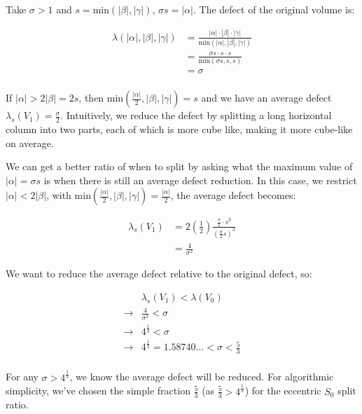 Take $\sigma > 1$ and $s = \text{min}(|\beta|,|\gamma|)$, $\sigma s = |\alpha|$.
The defect of the original volume is:

$$
\begin{array}{ll}
  \lambda(|\alpha|,|\beta|,|\gamma|)  & = \frac{ |\alpha| \cdot |\beta| \cdot |\gamma| }{ \text{min}(|\alpha|,|\beta|,|\gamma|) } \\
                  & = \frac{ \sigma s \cdot s \cdot s }{ \text{min}(\sigma s,s,s) } \\
                  & = \sigma \\
\end{array}
$$

If $|\alpha| > 2 |\beta| = 2s$, then $\text{min}(\frac{|\alpha|}{2},|\beta|,|\gamma|) = s$ and we have an average defect $\lambda_s(V_1) = \frac{\sigma}{2}$.
Intuitively, we reduce the defect by splitting a long horizontal column into two parts, each of which is more cube like,
making it more cube-like on average.

We can get a better ratio of when to split by asking what the maximum value of $|\alpha| = \sigma s$ is when there is still an average defect reduction.
In this case, we restrict $|\alpha| < 2 |\beta|$, with $\text{min}(\frac{|\alpha|}{2},|\beta|,|\gamma|) = \frac{|\alpha|}{2}$,
the average defect becomes:

$$
\begin{array}{ll}
  \lambda_s(V_1) & = 2 (\frac{1}{2}) \frac{ \frac{\sigma}{2} \cdot s^3 }{ (\frac{\sigma}{2} s)^3 } \\
   & = \frac{4}{\sigma^2}
\end{array}
$$

We want to reduce the average defect relative to the original defect, so:

$$
\begin{array}{ll}
  & \lambda_s (V_1) < \lambda(V_0) \\
  \to & \frac{4}{\sigma^2} < \sigma \\
  \to & 4^{\frac{1}{3}} < \sigma \\ 
  \to & 4^{\frac{1}{3}} = 1.58740\dots < \sigma < \frac{5}{3} \\
\end{array}
$$

For any $\sigma > 4^{\frac{1}{3}}$, we know the average defect will be reduced.
For algorithmic simplicity, we've chosen the simple fraction $\frac{5}{3}$ (as $\frac{5}{3} > 4^{\frac{1}{3}}$)
for the eccentric $S_0$ split ratio.

